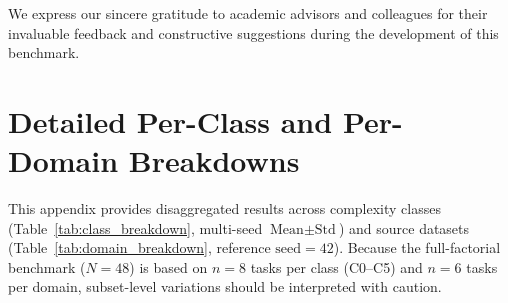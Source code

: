 \documentclass[sigconf]{acmart}
\begin{document}
\begin{acks}
We express our sincere gratitude to academic advisors and colleagues for their invaluable feedback and constructive suggestions during the development of this benchmark.
\end{acks}







\appendix
\enlargethispage{2\baselineskip}

\section{Detailed Per-Class and Per-Domain Breakdowns}
\label{app:detailed_breakdowns}

This appendix provides disaggregated results across complexity classes (Table~\ref{tab:class_breakdown}, multi-seed $\text{Mean} \pm \text{Std}$) and source datasets (Table~\ref{tab:domain_breakdown}, reference $\text{seed}=42$). Because the full-factorial benchmark ($N=48$) is based on $n=8$ tasks per class (C0--C5) and $n=6$ tasks per domain, subset-level variations should be interpreted with caution.
\end{document}
